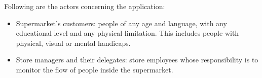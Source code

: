 \documentclass[../../main.tex]{subfiles}
\begin{document}
	Following are the actors concerning the application:
	\begin{itemize}
		\item Supermarket's customers: people of any age and language, with any educational level and any physical limitation. This includes people with physical, visual or mental handicaps.
		\item Store managers and their delegates: store employees whose responsibility is to monitor the flow of people inside the supermarket.
	\end{itemize}
\end{document}
